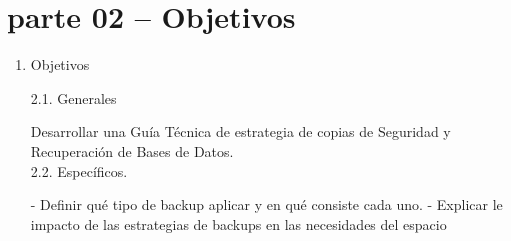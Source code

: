 \section{parte 02 – Objetivos} 

\begin{enumerate}[1.]
	\item 	Objetivos 

2.1.	Generales

Desarrollar una Guía Técnica de estrategia de copias de Seguridad y Recuperación de Bases de Datos.\\

2.2.	Específicos.

- Definir qué tipo de backup aplicar y en qué consiste cada uno.
- Explicar le impacto de las estrategias de backups en las necesidades del espacio


	

\end{enumerate} 
